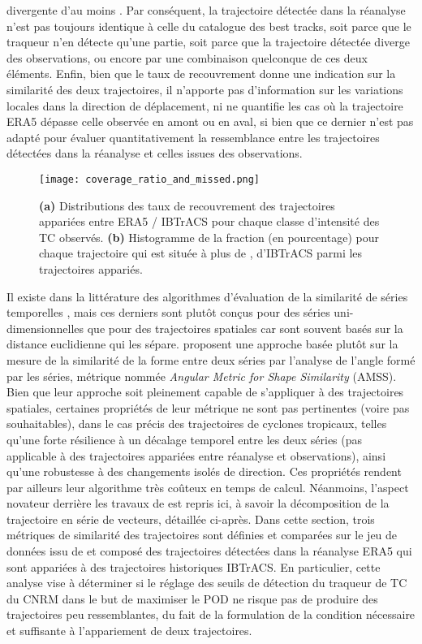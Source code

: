 \documentclass[../main.tex]{subfiles}
\begin{document}
divergente d'au moins . Par conséquent, la trajectoire détectée dans la réanalyse n'est pas toujours identique à celle du catalogue des best tracks,
soit parce que le traqueur n'en détecte qu'une partie, soit parce que la trajectoire détectée diverge des observations, ou encore par une combinaison quelconque
de ces deux éléments. Enfin, bien que le taux de recouvrement donne une indication sur la similarité des deux trajectoires, il n'apporte pas d'information sur
les variations locales dans la direction de déplacement, ni ne quantifie les cas où la trajectoire ERA5 dépasse celle observée en amont ou en aval, si bien que
ce dernier n'est pas adapté pour évaluer quantitativement la ressemblance entre les trajectoires détectées dans la réanalyse et celles issues des observations.

\begin{figure}[tb]
    \centering
    \texttt{[image: coverage\_ratio\_and\_missed.png]}
    \caption{\textbf{(a)} Distributions des taux de recouvrement des trajectoires appariées entre ERA5 / IBTrACS pour chaque classe d'intensité des TC observés.
    \textbf{(b)} Histogramme de la fraction (en pourcentage) pour chaque trajectoire qui est située à plus de , d'IBTrACS parmi les trajectoires appariés.}
    \label{fig:coverage_ratio}
\end{figure}

Il existe dans la littérature des algorithmes d'évaluation de la similarité de séries temporelles
\parencite{faloutsos_fast_1994,das_finding_1997,frentzos_indexbased_2007}, mais ces derniers sont plutôt conçus pour des séries uni-dimensionnelles que pour des
trajectoires spatiales car sont souvent basés sur la distance euclidienne qui les sépare. \cite{nakamura_shapebased_2013} proposent une approche basée plutôt
sur la mesure de la similarité de la forme entre deux séries par l'analyse de l'angle formé par les séries, métrique nommée \textit{Angular Metric for Shape
Similarity} (AMSS). Bien que leur approche soit pleinement capable de s'appliquer à des trajectoires spatiales, certaines propriétés de leur métrique ne sont
pas pertinentes (voire pas souhaitables), dans le cas précis des trajectoires de cyclones tropicaux, telles qu'une forte résilience à un décalage temporel entre
les deux séries (pas applicable à des trajectoires appariées entre réanalyse et observations), ainsi qu'une robustesse à des changements isolés de direction.
Ces propriétés rendent par ailleurs leur algorithme très coûteux en temps de calcul. Néanmoins, l'aspect novateur derrière les travaux de
\cite{nakamura_shapebased_2013} est repris ici, à savoir la décomposition de la trajectoire en série de vecteurs, détaillée ci-après. Dans cette section, trois
métriques de similarité des trajectoires sont définies et comparées sur le jeu de données issu de \cite{dulac_assessing_2023} et composé des trajectoires
détectées dans la réanalyse ERA5 qui sont appariées à des trajectoires historiques IBTrACS. En particulier, cette analyse vise à déterminer si le réglage des
seuils de détection du traqueur de TC du CNRM dans le but de maximiser le POD ne risque pas de produire des trajectoires peu ressemblantes, du fait de la
formulation de la condition nécessaire et suffisante à l'appariement de deux trajectoires.
\end{document}
